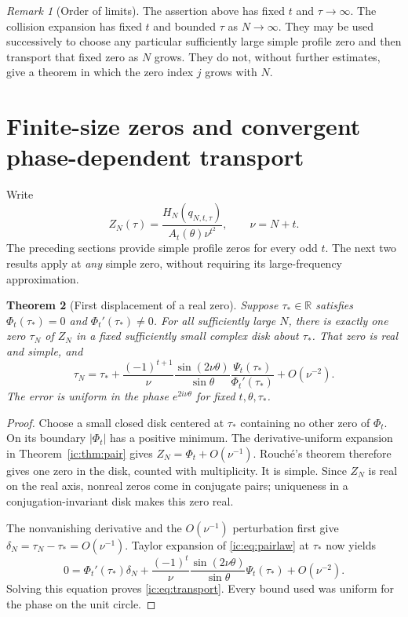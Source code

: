 \documentclass[11pt,a4paper]{article}
\numberwithin{equation}{section}
\newtheorem{theorem}{Theorem}[section]
\theoremstyle{definition}
\theoremstyle{remark}
\newtheorem{remark}[theorem]{Remark}
\newcommand{\RR}{\mathbb R}
\begin{document}
\begin{remark}[Order of limits]
The assertion above has fixed $t$ and $\tau\to\infty$. The collision
expansion has fixed $t$ and bounded $\tau$ as $N\to\infty$. They may be
used successively to choose any particular sufficiently large simple
profile zero and then transport that fixed zero as $N$ grows. They do
not, without further estimates, give a theorem in which the zero index
$j$ grows with $N$.
\end{remark}

\section{Finite-size zeros and convergent phase-dependent transport}
\label{ic:sec:zeros}
Write
\begin{equation}\label{ic:eq:ZN}
 Z_N(\tau)=\frac{H_N(q_{N,t,\tau})}{A_t(\theta)\nu^{t^2}},
 \qquad \nu=N+t.
\end{equation}
The preceding sections provide simple profile zeros for every odd $t$.
The next two results apply at \emph{any} simple zero, without requiring
its large-frequency approximation.

\begin{theorem}[First displacement of a real zero]\label{ic:thm:transport}
Suppose $\tau_*\in\RR$ satisfies
$\Phi_t(\tau_*)=0$ and $\Phi_t'(\tau_*)\ne0$. For all sufficiently large
$N$, there is exactly one zero $\tau_N$ of $Z_N$ in a fixed sufficiently
small complex disk about $\tau_*$. That zero is real and simple, and
\begin{equation}\label{ic:eq:transport}
 \tau_N=\tau_*+
 \frac{(-1)^{t+1}}\nu\frac{\sin(2\nu\theta)}{\sin\theta}
 \frac{\Psi_t(\tau_*)}{\Phi_t'(\tau_*)}
 +O(\nu^{-2}).
\end{equation}
The error is uniform in the phase $e^{2i\nu\theta}$ for fixed
$t,\theta,\tau_*$.
\end{theorem}
\begin{proof}
Choose a small closed disk centered at $\tau_*$ containing no other
zero of $\Phi_t$. On its boundary $|\Phi_t|$ has a positive minimum.
The derivative-uniform expansion in Theorem~\ref{ic:thm:pair} gives
$Z_N=\Phi_t+O(\nu^{-1})$. Rouch\'e's theorem therefore gives one zero in
the disk, counted with multiplicity. It is simple. Since $Z_N$ is real
on the real axis, nonreal zeros come in conjugate pairs; uniqueness in
a conjugation-invariant disk makes this zero real.

The nonvanishing derivative and the $O(\nu^{-1})$ perturbation first give
$\delta_N=\tau_N-\tau_*=O(\nu^{-1})$. Taylor expansion of
\eqref{ic:eq:pairlaw} at $\tau_*$ now yields
\[
 0=\Phi_t'(\tau_*)\delta_N+
 \frac{(-1)^t}{\nu}\frac{\sin(2\nu\theta)}{\sin\theta}
 \Psi_t(\tau_*)+O(\nu^{-2}).
\]
Solving this equation proves \eqref{ic:eq:transport}. Every bound used was
uniform for the phase on the unit circle.
\end{proof}
\end{document}
